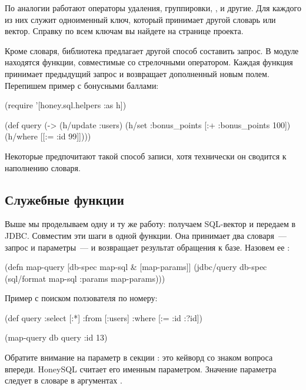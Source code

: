 По аналогии работают операторы удаления, группировки, ,  и другие. Для каждого из них служит одноименный ключ, который принимает другой словарь или вектор. Справку по всем ключам вы найдете на странице проекта.

Кроме словаря, библиотека предлагает другой способ составить запрос. В модуле  находятся функции, совместимые со стрелочными оператором. Каждая функция принимает предыдущий запрос и возвращает дополненный новым полем. Перепишем пример с бонусными баллами:

\begin{english}
  \begin{clojure}
(require '[honey.sql.helpers :as h])

(def query
  (-> (h/update :users)
      (h/set {:bonus_points [:+ :bonus_points 100]})
      (h/where [[:= :id 99]])))
  \end{clojure}
\end{english}

Некоторые предпочитают такой способ записи, хотя технически он сводится к наполнению словаря.

\subsection{Служебные функции}

Выше мы проделываем одну и ту же работу: получаем SQL-вектор и передаем в JDBC. Совместим эти шаги в одной функции. Она принимает два словаря~--- запрос и параметры~--- и возвращает результат обращения к базе. Назовем ее :

\begin{english}
  \begin{clojure}
(defn map-query [db-spec map-sql & [map-params]]
  (jdbc/query db-spec (sql/format map-sql {:params map-params})))
  \end{clojure}
\end{english}

Пример с поиском ползователя по номеру:

\begin{english}
  \begin{clojure}
(def query
  {:select [:*]
   :from [:users]
   :where [:= :id :?id]})

(map-query db query {:id 13})
  \end{clojure}
\end{english}

Обратите внимание на параметр  в секции : это кейворд со знаком вопроса впереди. HoneySQL считает его именным параметром. Значение параметра следует в словаре  в аргументах .

